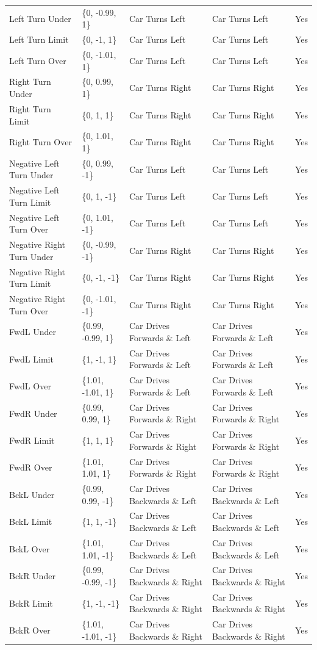 \begin{table}[ht]
\begin{tabular}{lllll}
Left Turn Under & \{0, -0.99, 1\} & Car Turns Left & Car Turns Left & Yes \\
Left Turn Limit & \{0, -1, 1\} & Car Turns Left & Car Turns Left & Yes \\
Left Turn Over & \{0, -1.01, 1\} & Car Turns Left & Car Turns Left & Yes \\
Right Turn Under & \{0, 0.99, 1\} & Car Turns Right & Car Turns Right & Yes \\
Right Turn Limit & \{0, 1, 1\} & Car Turns Right & Car Turns Right & Yes \\
Right Turn Over & \{0, 1.01, 1\} & Car Turns Right & Car Turns Right & Yes \\
Negative Left Turn Under & \{0, 0.99, -1\} & Car Turns Left & Car Turns Left & Yes \\
Negative Left Turn Limit & \{0, 1, -1\} & Car Turns Left & Car Turns Left & Yes \\
Negative Left Turn Over & \{0, 1.01, -1\} & Car Turns Left & Car Turns Left & Yes \\
Negative Right Turn Under & \{0, -0.99, -1\} & Car Turns Right & Car Turns Right & Yes \\
Negative Right Turn Limit & \{0, -1, -1\} & Car Turns Right & Car Turns Right & Yes \\
Negative Right Turn Over & \{0, -1.01, -1\} & Car Turns Right & Car Turns Right & Yes \\

FwdL Under & \{0.99, -0.99, 1\} & Car Drives Forwards \& Left & Car Drives Forwards \& Left & Yes \\
FwdL Limit & \{1, -1, 1\} & Car Drives Forwards \& Left & Car Drives Forwards \& Left & Yes \\
FwdL Over & \{1.01, -1.01, 1\} & Car Drives Forwards \& Left & Car Drives Forwards \& Left & Yes \\
FwdR Under & \{0.99, 0.99, 1\} & Car Drives Forwards \& Right & Car Drives Forwards \& Right & Yes \\
FwdR Limit & \{1, 1, 1\} & Car Drives Forwards \& Right & Car Drives Forwards \& Right & Yes \\
FwdR Over & \{1.01, 1.01, 1\} & Car Drives Forwards \& Right & Car Drives Forwards \& Right & Yes \\
BckL Under & \{0.99, 0.99, -1\} & Car Drives Backwards \& Left & Car Drives Backwards \& Left & Yes \\
BckL Limit & \{1, 1, -1\} & Car Drives Backwards \& Left & Car Drives Backwards \& Left & Yes \\
BckL Over & \{1.01, 1.01, -1\} & Car Drives Backwards \& Left & Car Drives Backwards \& Left & Yes \\
BckR Under & \{0.99, -0.99, -1\} & Car Drives Backwards \& Right & Car Drives Backwards \& Right & Yes \\
BckR Limit & \{1, -1, -1\} & Car Drives Backwards \& Right & Car Drives Backwards \& Right & Yes \\
BckR Over & \{1.01, -1.01, -1\} & Car Drives Backwards \& Right & Car Drives Backwards \& Right & Yes \\


\end{tabular}
\end{table}
